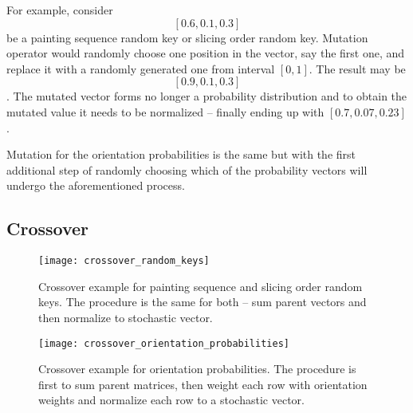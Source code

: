 For example, consider $$[0.6, 0.1, 0.3]$$ be a painting sequence random key or slicing order random key.
Mutation operator would randomly choose one position in the vector, say the first one, and replace it
with a randomly generated one from interval $[0,1]$. The result may be $$[0.9, 0.1, 0.3]$$.
The mutated vector forms no longer a probability distribution and to obtain the mutated value
it needs to be normalized – finally ending up with $[0.7, 0.07, 0.23]$.

Mutation for the orientation probabilities is the same but with the first additional
step of randomly choosing which of the probability vectors will undergo the aforementioned process.

\subsection{Crossover}\label{subsec:crossover}

\begin{figure}[htp]
    \texttt{[image: crossover\_random\_keys]}\caption{
        Crossover example for painting sequence and slicing order random keys.
        The procedure is the same for both – sum parent vectors and then normalize to stochastic vector.
    }
    \label{fig:crossover-random-keys}
\end{figure}

\begin{figure}[htp]
    \texttt{[image: crossover\_orientation\_probabilities]}\caption{
        Crossover example for orientation probabilities. The procedure is first to sum parent matrices,
        then weight each row with orientation weights and normalize each row to a stochastic vector.}
    \label{fit:crossover-orientation-probabilities}
\end{figure}


